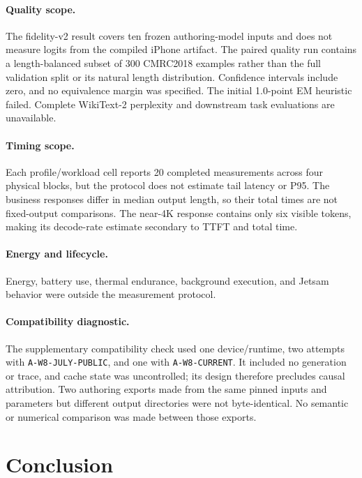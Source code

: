 \documentclass[10pt]{article}
\DeclareRobustCommand{\evidence}[1]{}
\DeclareRobustCommand{\artifact}[1]{\nolinkurl{#1}}
\begin{document}
\paragraph{Quality scope.}
The fidelity-v2 result covers ten frozen authoring-model inputs and does not measure logits from the compiled iPhone artifact.\evidence{CL-07} The paired quality run contains a length-balanced subset of 300 CMRC2018 examples rather than the full validation split or its natural length distribution.\evidence{CL-12,CL-13} Confidence intervals include zero, and no equivalence margin was specified.\evidence{CL-14} The initial 1.0-point EM heuristic failed.\evidence{CL-13,CL-14} Complete WikiText-2 perplexity and downstream task evaluations are unavailable.

\paragraph{Timing scope.}
Each profile/workload cell reports 20 completed measurements across four physical blocks, but the protocol does not estimate tail latency or P95.\evidence{CL-17,CL-18,CL-19} The business responses differ in median output length, so their total times are not fixed-output comparisons. The near-4K response contains only six visible tokens, making its decode-rate estimate secondary to TTFT and total time.\evidence{CL-18,CL-19}

\paragraph{Energy and lifecycle.}
Energy, battery use, thermal endurance, background execution, and Jetsam behavior were outside the measurement protocol.

\paragraph{Compatibility diagnostic.}
The supplementary compatibility check used one device/runtime, two attempts with \artifact{A-W8-JULY-PUBLIC}, and one with \artifact{A-W8-CURRENT}. It included no generation or trace, and cache state was uncontrolled; its design therefore precludes causal attribution.\evidence{CL-22,CL-28} Two authoring exports made from the same pinned inputs and parameters but different output directories were not byte-identical. No semantic or numerical comparison was made between those exports.\evidence{CL-29}

\section{Conclusion}
\end{document}
